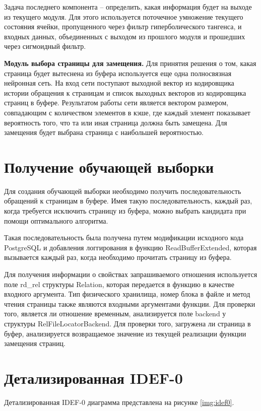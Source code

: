 Задача последнего компонента -- определить, какая информация будет на выходе из текущего модуля.
Для этого используется поточечное умножение текущего состояния ячейки, пропущенного через фильтр гиперболического тангенса, и входных данных, объединенных с выходом из прошлого модуля и прошедших через сигмоидный фильтр.

\textbf{Модуль выбора страницы для замещения.}
Для принятия решения о том, какая страница будет вытеснена из буфера используется еще одна полносвязная нейронная сеть.
На вход сети поступают выходной вектор из кодировщика истории обращения к страницам и список выходных векторов из кодировщика страниц в буфере.
Результатом работы сети является вектором размером, совпадающим с количеством элементов в кэше, где каждый элемент показывает вероятность того, что та или иная страница должна быть замещена.
Для замещения будет выбрана страница с наибольшей вероятностью.

\section{Получение обучающей выборки}
Для создания обучающей выборки необходимо получить последовательность обращений к страницам в буфере.
Имея такую последовательность, каждый раз, когда требуется исключить страницу из буфера, можно выбрать кандидата при помощи оптимального алгоритма.

Такая последовательность была получена путем модификации исходного кода PostgreSQL и добавления логгирования в функцию ReadBufferExtended, которая вызывается каждый раз, когда необходимо прочитать страницу из буфера.

Для получения информации о свойствах запрашиваемого отношения используется поле rd\_rel структуры Relation, которая передается в функцию в качестве входного аргумента.
Тип физического хранилища, номер блока в файле и метод чтения страницы также являются входными аргументами функции.
Для проверки того, является ли отношение временным, анализируется поле backend у структуры RelFileLocatorBackend.
Для проверки того, загружена ли страница в буфер, анализируется возвращаемое значение из текущей реализации функции замещения страниц.

\section{Детализированная IDEF-0}

Детализированная IDEF-0 диаграмма представлена на рисунке \ref{img:idef0}.

